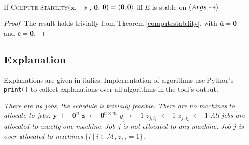 \begin{corollary}\ \\
	If \textsc{Compute-Stability}$(\mathbf{x}$, $\twoheadrightarrow$, $\mathbf{0}$, $\mathbf{0})=\langle{\mathbf{0}},{\mathbf{0}}\rangle$ iff $E$ is stable on $\langle{Args},{\rightsquigarrow}\rangle$
	
	\begin{proof}
		The result holds trivially from Theorem \ref{computestability}, with $\bar{\mathbf{u}}=\mathbf{0}$ and $\bar{\mathbf{c}}=\mathbf{0}$. 
	\end{proof}
\end{corollary}

\subsection{Explanation}

Explanations are given in italics. Implementation of algorithms use Python's \verb|print()| to collect explanations over all algorithms in the tool's output.

\begin{algorithm}[H]
	\caption{}
	\begin{algorithmic}[1]
					\State \emph{There are no jobs, the schedule is trivially feasible.}
				\Else
					\State \emph{There are no machines to allocate to jobs.}
				\EndIf
			\Else
				\State $\mathbf{y}$ $\gets$ $\mathbf{0}^n$
				\State $\mathbf{z}$ $\gets$ $\mathbf{0}^{n\times m}$
						\State $y_j$ $\gets$ $1$
						\State $z_{j,i_1}$ $\gets$ $1$
						\State $z_{j,i_2}$ $\gets$ $1$
					\EndIf
				\EndFor
					\State \emph{All jobs are allocated to exactly one machine.}
				\Else
							\State \emph{Job $j$ is not allocated to any machine.}
						\EndIf
							\State \emph{Job $j$ is over-allocated to machines $\{i\ |\ i\in\mathcal{M}, z_{j,i}=1\}$.}
						\EndIf
					\EndFor
				\EndIf
			\EndIf
		\EndFunction
	\end{algorithmic}
\end{algorithm}

